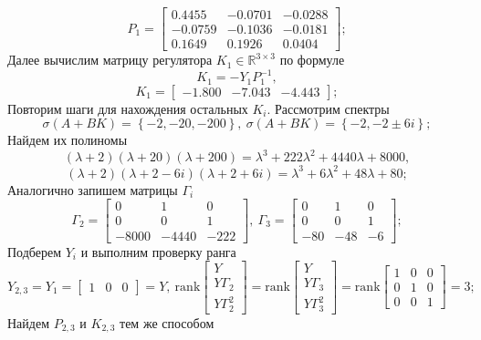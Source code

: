 \documentclass[a4paper, 12pt]{article}
\begin{document}
    $$
    P_1=\begin{bmatrix}
    0.4455   &-0.0701   &-0.0288\\
   -0.0759   &-0.1036   &-0.0181\\
    0.1649    &0.1926    &0.0404
    \end{bmatrix};
    $$
    Далее вычислим матрицу регулятора $K_1\in\mathbb{R}^{3\times3}$ по формуле
    $$K_1=-Y_1P_1^{-1},$$
    $$K_1=\begin{bmatrix}
        -1.800   &-7.043   &-4.443
    \end{bmatrix};$$
    Повторим шаги для нахождения остальных $K_i$. Рассмотрим спектры $$\sigma\left(A+BK\right)=\left\{-2,-20,-200\right\},\ \sigma\left(A+BK\right)=\left\{-2,-2\pm6i\right\};$$
    Найдем их полиномы
    $$\left(\lambda+2\right)\left(\lambda+20\right)\left(\lambda+200\right)=\lambda^3+222\lambda^2+4440\lambda+8000,$$
    $$\left(\lambda+2\right)\left(\lambda+2-6i\right)\left(\lambda+2+6i\right)=\lambda^3+6\lambda^2+48\lambda+80;$$
    Аналогично запишем матрицы $\Gamma_i$
    $$\Gamma_2=\begin{bmatrix}
        0 &1 &0\\
        0 &0 &1\\
        -8000 &-4440 &-222
    \end{bmatrix},\ \Gamma_3=\begin{bmatrix}
        0 &1 &0\\
        0 &0 &1\\
        -80 &-48 &-6
    \end{bmatrix};$$
    Подберем $Y_i$ и выполним проверку ранга
    $$
    Y_{2,3}=Y_1=\begin{bmatrix}
        1 &0 &0
    \end{bmatrix}=Y,\
    \text{rank}\begin{bmatrix}
        Y\\
        Y\Gamma_2\\
        Y\Gamma_2^2
    \end{bmatrix}=\text{rank}\begin{bmatrix}
        Y\\
        Y\Gamma_3\\
        Y\Gamma_3^2
    \end{bmatrix}=\text{rank}\begin{bmatrix}
        1 &0 &0\\
        0 &1 &0\\
        0 &0 &1
    \end{bmatrix}=3;
    $$
    Найдем $P_{2,3}$ и $K_{2,3}$ тем же способом
\end{document}
